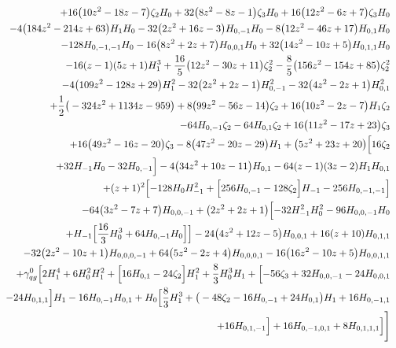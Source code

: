 \begin{eqnarray}
\nonumber \\ &&
+16 \big(10 z^2-18z-7\big) \zeta_2 H_0+32 \big(8 z^2-8 z-1\big) \zeta_3 H_0+16 \big(12 z^2-6 z+7\big) \zeta_3 H_0
\nonumber \\ &&
-4 \big(184 z^2-214 z+63\big) H_1H_0-32  \big(2 z^2+16 z-3\big) H_{0,-1} H_0-8 \big(12 z^2-46 z+17\big)H_{0,1} H_0
\nonumber \\ &&
-128  H_{0,-1,-1} H_0-16 \big(8 z^2+2 z+7\big) H_{0,0,1}H_0+32 \big(14 z^2-10 z+5\big) H_{0,1,1} H_0
\nonumber \\ &&
-16 (z-1) (5 z+1)H_1^3+\frac{16}{5}  \big(12 z^2-30 z+11\big) \zeta_2^2-\frac{8}{5}\big(156 z^2-154 z+85\big) \zeta_2^2
\nonumber \\ &&
-4 \big(109 z^2-128 z+29\big)H_1^2-32  \big(2 z^2+2 z-1\big) H_{0,-1}^2-32 \big(4 z^2-2 z+1\big)H_{0,1}^2
\nonumber \\ &&
+\frac{1}{2} \big(-324 z^2+1134 z-959\big)+8 \big(99 z^2-56 z-14\big)\zeta_2+16 \big(10 z^2-2 z-7\big) H_1 \zeta_2
\nonumber \\ &&
-64  H_{0,-1}\zeta_2-64 H_{0,1} \zeta_2+16  \big(11 z^2-17 z+23\big)\zeta_3
\nonumber \\ &&
+16 \big(49 z^2-16 z-20\big) \zeta_3-8 \big(47 z^2-20z-29\big) H_1+\big(5 z^2+23 z+20\big) \Bigl[16  \zeta_2
\nonumber \\ &&
+32 H_{-1} H_0-32  H_{0,-1}\Bigr]-4 \big(34 z^2+10 z-11\big) H_{0,1}-64 (z-1)(3 z-2) H_1 H_{0,1}
\nonumber \\ &&
+(z+1)^2 \Bigl[-128  H_0 H_{-1}^2+\Bigl[256 H_{0,-1}-128  \zeta_2\Bigr] H_{-1}-256  H_{0,-1,-1}\Bigr]
\nonumber \\ &&
-64 \big(3 z^2-7 z+7\big) H_{0,0,-1}+\big(2 z^2+2 z+1\big) \Bigl[-32 H_{-1}^2 H_0^2-96  H_{0,0,-1} H_0
\nonumber \\ &&
+H_{-1} \Bigl[\frac{16}{3} H_0^3+64  H_{0,-1} H_0\Bigr]\Bigr]-24 \big(4 z^2+12 z-5\big) H_{0,0,1}+16(z+10) H_{0,1,1}
\nonumber \\ &&
-32  \big(2 z^2-10 z+1\big) H_{0,0,0,-1}+64 \big(5 z^2-2z+4\big) H_{0,0,0,1}-16 \big(16 z^2-10 z+5\big)H_{0,0,1,1}
\nonumber \\ &&
+{\gamma}_{qg}^{0} \Bigl[2 H_1^4+6 H_0^2 H_1^2+\Bigl[16H_{0,1}-24 \zeta_2\Bigr] H_1^2+\frac{8}{3} H_0^3 H_1+\Bigl[-56 \zeta_3+32 H_{0,0,-1}-24 H_{0,0,1}
\nonumber \\ &&
-24 H_{0,1,1}\Bigr] H_1-16 H_{0,-1} H_{0,1}+H_0\Bigl[\frac{8}{3} H_1^3+\big(-48 \zeta_2-16 H_{0,-1}+24 H_{0,1}\big)H_1+16 H_{0,-1,1}
\nonumber \\ &&
+16 H_{0,1,-1}\Bigr]+16 H_{0,-1,0,1}+8H_{0,1,1,1}\Bigr]\Biggr]

\end{eqnarray}
